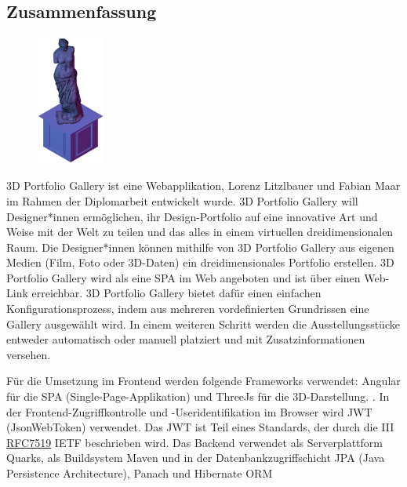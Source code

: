 \newpage
\begin{spacing}{1}
    \chapter*{Zusammenfassung}
\end{spacing}
\begin{figure}
    \begin{center}
      \includegraphics[width=0.2\textwidth]{pics/statue.png}
    \end{center}
\end{figure}
3D Portfolio Gallery ist eine Webapplikation, Lorenz Litzlbauer und Fabian Maar im Rahmen der Diplomarbeit entwickelt wurde. 3D Portfolio Gallery will Designer*innen ermöglichen, ihr Design-Portfolio auf eine innovative Art und Weise mit der Welt zu teilen und das alles in einem virtuellen dreidimensionalen Raum. Die Designer*innen können mithilfe von 3D Portfolio Gallery aus eigenen Medien (Film, Foto oder 3D-Daten) ein dreidimensionales Portfolio erstellen.
3D Portfolio Gallery wird als eine SPA im Web angeboten und ist über einen Web-Link erreichbar.
3D Portfolio Gallery bietet dafür einen einfachen Konfigurationsprozess, indem aus mehreren vordefinierten Grundrissen eine Gallery ausgewählt wird. In einem weiteren Schritt werden die Ausstellungsstücke entweder automatisch oder manuell platziert und mit Zusatzinformationen versehen.


Für die Umsetzung im Frontend werden folgende Frameworks verwendet: Angular für die SPA (Single-Page-Applikation) und ThreeJs für die 3D-Darstellung. . In der Frontend-Zugriffkontrolle und -Useridentifikation im Browser wird JWT (JsonWebToken) verwendet. Das JWT ist Teil eines Standards, der durch die III \href{https://www.rfc-editor.org/rfc/rfc7519}{RFC7519} IETF beschrieben wird.
Das Backend verwendet als Serverplattform Quarks, als Buildsystem Maven und in der Datenbankzugriffschicht JPA (Java Persistence Architecture), Panach und Hibernate ORM

